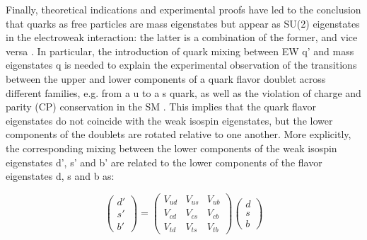 \indent Finally, theoretical indications and experimental proofs have led to the conclusion that quarks as free particles are mass eigenstates but appear as SU(2) eigenstates in the electroweak interaction: the latter is a combination of the former, and vice versa \cite{Matsuoka_1998}. In particular, the introduction of quark mixing between EW q' and mass eigenstates q is needed to explain the experimental observation of the transitions between the upper and lower components of a quark flavor doublet across different families, e.g. from a u to a s quark, as well as the violation of charge and parity (CP) conservation in the SM \cite{10.1143/PTP.49.652, Cabibbo}. This implies that the quark flavor eigenstates do not coincide with the weak isospin eigenstates, but the lower components of the doublets are rotated relative to one another. More explicitly, the corresponding mixing between the lower components of the weak isospin eigenstates d', s' and b' are related to the lower components of the flavor eigenstates d, s and b as:

\begin{equation}
    \begin{pmatrix}
        d' \\ s' \\ b'
    \end{pmatrix} = \begin{pmatrix}
        V_{ud} & V_{us} & V_{ub} \\
        V_{cd} & V_{cs} & V_{cb} \\
        V_{td} & V_{ts} & V_{tb} 
    \end{pmatrix} \begin{pmatrix}
        d \\ s \\ b
    \end{pmatrix}
\end{equation}

